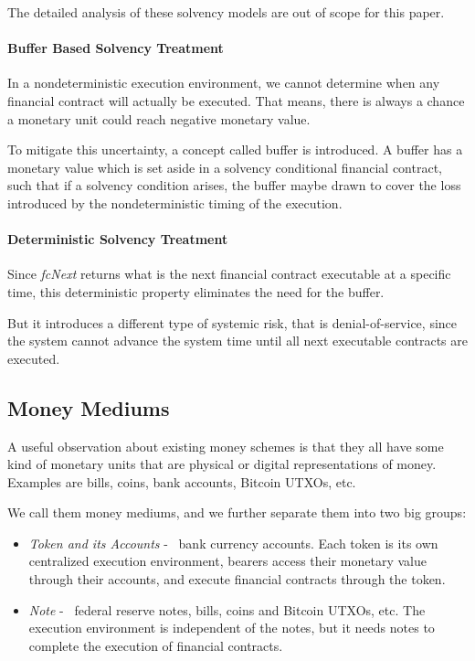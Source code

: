The detailed analysis of these solvency models are out of scope for this paper.

\paragraph{Buffer Based Solvency Treatment}

In a nondeterministic execution environment, we cannot determine when any financial contract will actually be
executed. That means, there is always a chance a monetary unit could reach negative monetary value.

To mitigate this uncertainty, a concept called buffer is introduced. A buffer has a monetary value which is set aside in a solvency conditional financial contract, such that if a solvency
condition arises, the buffer maybe drawn to cover the loss introduced by the nondeterministic timing of the execution.

\paragraph{Deterministic Solvency Treatment}

Since \textit{fcNext} returns what is the next financial contract executable at a specific time, this deterministic
property eliminates the need for the buffer.

But it introduces a different type of systemic risk, that is denial-of-service, since the system cannot advance the
system time until all next executable contracts are executed.


\subsection{Money Mediums}

\begin{displayquote}
A useful observation about existing money schemes is that they all have some kind of monetary units that are physical or
digital representations of money. Examples are bills, coins, bank accounts, Bitcoin UTXOs,
etc. 
\end{displayquote}

We call them money mediums, and we further separate them into two big groups:

\begin{itemize}
\item \textit{Token and its Accounts} - \eg\ bank currency accounts. Each token is its own centralized execution
    environment, bearers access their monetary value through their accounts, and execute financial contracts through the
    token.
\item \textit{Note} - \eg\ federal reserve notes, bills, coins and Bitcoin UTXOs, etc. The execution environment is
    independent of the notes, but it needs notes to complete the execution of financial contracts.
\end{itemize}

